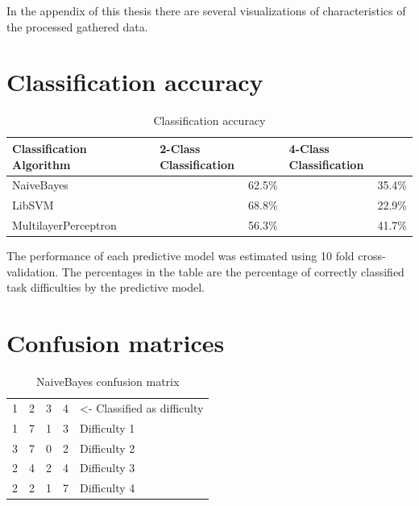 \documentclass[11pt,leqno,a4paper]{report} %
\begin{document}
In the appendix of this thesis there are several visualizations of characteristics of the processed gathered data.

\pagebreak




\section{Classification accuracy}
\begin{table}[h]
\caption {Classification accuracy} 
\center
\begin{tabular}{@{}lrr@{}}
\toprule
Classification Algorithm & \multicolumn{1}{l}{2-Class Classification} & \multicolumn{1}{l}{4-Class Classification} \\ \midrule
NaiveBayes               & 62.5\%                                     & 35.4\%                                     \\
LibSVM                   & 68.8\%                                     & 22.9\%                                     \\
MultilayerPerceptron     & 56.3\%                                     & 41.7\%                                     \\ \bottomrule
\end{tabular}
\end{table}

The performance of each predictive model was estimated using 10 fold cross-validation. The percentages in the table are the percentage of correctly classified task difficulties by the predictive model.

\pagebreak

\section{Confusion matrices}

\begin{table}[h]
\caption {NaiveBayes confusion matrix} 
\center
\begin{tabular}{ccccl}
\multicolumn{1}{l}{1} & \multicolumn{1}{l}{2} & \multicolumn{1}{l}{3} & \multicolumn{1}{l}{4} & \small{\textless- Classified as difficulty} \\ \cline{1-4}
1                          & 7                          & 1                          & \multicolumn{1}{c|}{3}     & Difficulty 1                    \\
3                          & 7                          & 0                          & \multicolumn{1}{c|}{2}     & Difficulty 2                    \\
2                          & 4                          & 2                          & \multicolumn{1}{c|}{4}     & Difficulty 3                    \\
2                          & 2                          & 1                          & \multicolumn{1}{c|}{7}     & Difficulty 4                   
\end{tabular}
\end{table}
\end{document}
